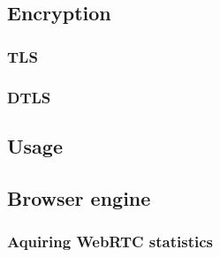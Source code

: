 \subsection{Encryption}
\subsubsection{TLS}
\subsubsection{DTLS}
\subsection{Usage}
\subsection{Browser engine}
\subsubsection{Aquiring WebRTC statistics}


